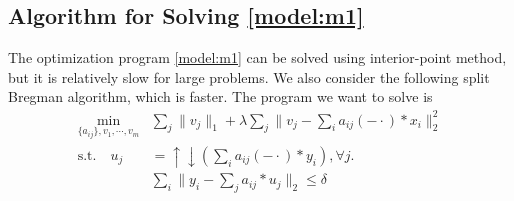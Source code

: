 \documentclass[a4paper]{article}
\begin{document}
\subsection{Algorithm for Solving \eqref{model:m1}}

The optimization program \eqref{model:m1} can be solved using interior-point method, but it is relatively slow for large problems. We also consider the following split Bregman algorithm, which is faster. The program we want to solve is 
\begin{equation}
\begin{aligned}
		\min_{\{a_{ij}\}, v_1,\cdots,v_m}& \sum_j \|v_j\|_1 + \lambda \sum_j \|v_j-  \sum_{i} a_{ij}(-\cdot)*x_i \|_2^2\\
	 \textrm{s.t.}  	\quad 	u_j&=\uparrow\downarrow(\sum_i a_{ij}(-\cdot)*y_i), \forall j.\\
	&\sum_i \|y_i - \sum_j a_{ij}*u_j\|_2  \leq \delta\\
	\end{aligned}
\end{equation}
\end{document}
